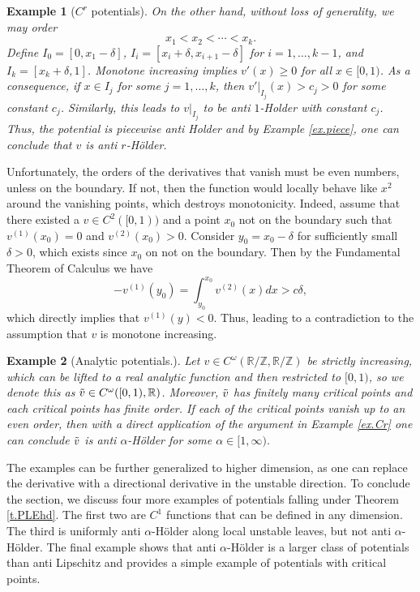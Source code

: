 \documentclass{amsart}
\newtheorem{example}{Example}
\newcommand{\RR}{\mathbb{R}}
\newcommand{\ZZ}{\mathbb{Z}}
\begin{document}
\begin{example}[$C^r$ potentials]
    On the other hand, without loss of generality, we may order
    \[x_1 < x_2 < \cdots < x_k.\]
    Define $I_0 = [0, x_1 - \delta]$, $I_i = [x_i+\delta, x_{i+1} - \delta]$ for $i = 1,\dots, k-1$, and $I_k = [x_k+\delta, 1]$. Monotone increasing implies $v'(x)\geq 0$ for all $x\in [0,1)$. As a consequence, if $x\in I_j$ for some $j = 1,\dots, k$, then $v'|_{I_j}(x) > c_j>0$ for some constant $c_j$. Similarly, this leads to $v|_{I_j}$ to be anti $1$-Holder with constant $c_j$. Thus, the potential is piecewise anti Holder and by Example \ref{ex.piece}, one can conclude that $v$ is anti $r$-H\"older.
\end{example}

Unfortunately, the orders of the derivatives that vanish must be even numbers, unless on the boundary. If not, then the function would locally behave like $x^2$ around the vanishing points, which destroys monotonicity. Indeed, assume that there existed a $v\in C^2([0,1))$ and a point $x_0$ not on the boundary such that $v^{(1)}(x_0) = 0$ and $v^{(2)}(x_0) > 0$. Consider $y_0 = x_0 -\delta$ for sufficiently small $\delta >0$, which exists since $x_0$ on not on the boundary. Then by the Fundamental Theorem of Calculus we have
\[- v^{(1)}(y_0) = \int_{y_0}^{x_0} v^{(2)}(x) dx > c \delta,\]
which directly implies that $v^{(1)}(y) < 0$. Thus, leading to a contradiction to the assumption that $v$ is monotone increasing. 

\begin{example}[Analytic potentials.]\label{ex.analytic}
    Let $v\in C^\omega(\RR/\ZZ, \RR/\ZZ)$ be strictly increasing, which can be lifted to a real analytic function and then restricted to $[0,1)$, so we denote this as $\Tilde{v}\in C^\omega([0,1),\RR)$. Moreover, $\Tilde{v}$ has finitely many critical points and each critical points has finite order. If each of the critical points vanish up to an even order, then with a direct application of the argument in Example \ref{ex.Cr} one can conclude $\Tilde{v}$ is anti $\alpha$-Hölder for some $\alpha\in [1,\infty)$.
\end{example}

The examples can be further generalized to higher dimension, as one can replace the derivative with a directional derivative in the unstable direction. To conclude the section, we discuss four more examples of potentials falling under Theorem \ref{t.PLEhd}. The first two are $C^1$ functions that can be defined in any dimension. The third is uniformly anti $\alpha$-H\"older along local unstable leaves, but not anti $\alpha$-H\"older. The final example shows that anti $\alpha$-H\"older is a larger class of potentials than anti Lipschitz and provides a simple example of potentials with critical points. 
\end{document}
